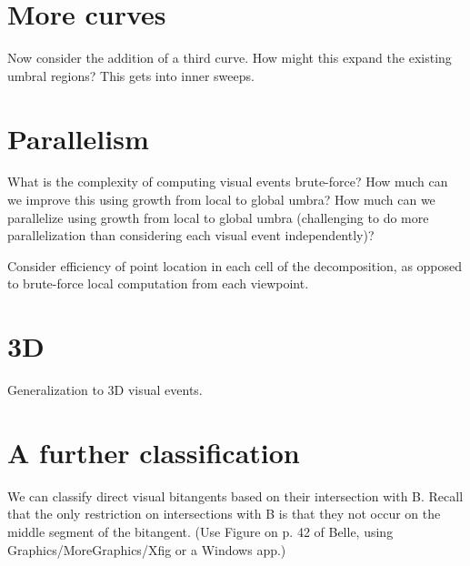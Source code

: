 \documentclass[12pt]{article}
\newif\ifCommentary             %
\begin{document}
\ifCommentary
A time-series as on p. 38 of BellSouth workbook [BS],
illustrating the many cases of the back umbra cast by a single curve.

The analysis of each class of umbral region will have three parts:
1) define the components of this umbral region (the bitangents);
2) count the components (are there enough?);
3) define the umbral region, using these components.
\fi

\section{More curves}

Now consider the addition of a third curve.
How might this expand the existing umbral regions?
This gets into inner sweeps.

\section{Parallelism}

What is the complexity of computing visual events brute-force?
How much can we improve this using growth from local to global umbra?
How much can we parallelize using growth from local to global umbra (challenging to do
more parallelization than considering each visual event independently)?

Consider efficiency of point location in each cell of the decomposition, as opposed
to brute-force local computation from each viewpoint.

\section{3D}

Generalization to 3D visual events.


\clearpage

\section{A further classification}

We can classify direct visual bitangents based on their intersection with B.
Recall that the only restriction on intersections with B is that they not occur
on the middle segment of the bitangent.
(Use Figure on p. 42 of Belle, using Graphics/MoreGraphics/Xfig or a Windows app.)
\end{document}
